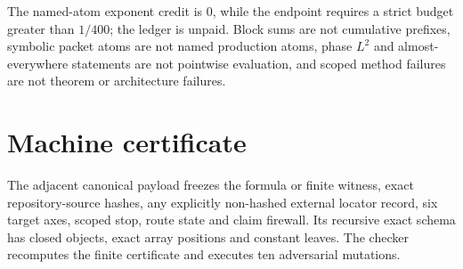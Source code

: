 \documentclass[11pt]{article}
\begin{document}
The named-atom exponent credit is \(0\), while the endpoint requires a
strict budget greater than \(1/400\); the ledger is unpaid.  Block sums are
not cumulative prefixes, symbolic packet atoms are not named production
atoms, phase \(L^2\) and almost-everywhere statements are not pointwise
evaluation, and scoped method failures are not theorem or architecture
failures.

\section{Machine certificate}
The adjacent canonical payload freezes the formula or finite witness,
exact repository-source hashes, any explicitly non-hashed external locator
record, six target axes, scoped stop, route state and claim firewall.  Its
recursive exact schema has closed objects, exact array positions and
constant leaves.  The checker recomputes the finite certificate and executes
ten adversarial mutations.



\end{document}
